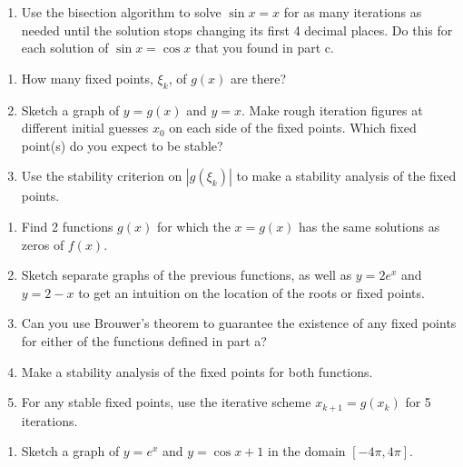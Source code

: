 {\begin{enumerate}[label=\alph*)]
	\item Use the bisection algorithm to solve $\sin x=x$ for as many iterations as needed       until the solution stops changing its first 4 decimal places. Do this for each       solution of $\sin x=\cos x$ that you found in part c.
\end{enumerate}



\begin{enumerate}[label=\alph*)]
	\item How many fixed points, $\xi_k$, of $g(x)$ are there?
	
	\item Sketch a graph of $y=g(x)$ and $y=x$. Make rough iteration figures at different initial guesses $x_0$ on each side of the fixed points. Which fixed point(s) do you expect to be stable?
	
	\item Use the stability criterion on $|g(\xi_k)|$ to make a stability analysis of the fixed points.
\end{enumerate}



\begin{enumerate}[label=\alph*)]
	\item Find 2 functions $g(x)$ for which the $x=g(x)$ has the same solutions as zeros of $f(x)$.
	
	\item Sketch separate graphs of the previous functions, as well as $y=2e^x$ and $y=2-x$ to get an intuition on the location of the roots or fixed points.
	
	\item Can you use Brouwer's theorem to guarantee the existence of any fixed points for either of the functions defined in part a?
	
	\item Make a stability analysis of the fixed points for both functions.
	
	\item For any stable fixed points, use the iterative scheme $x_{k+1}=g(x_k)$ for 5 iterations.
\end{enumerate}



\begin{enumerate}[label=\alph*)]
	\item Sketch a graph of $y=e^x$ and $y=\cos x + 1$ in the domain $[-4\pi,4\pi]$. 
	

\end{enumerate}}
